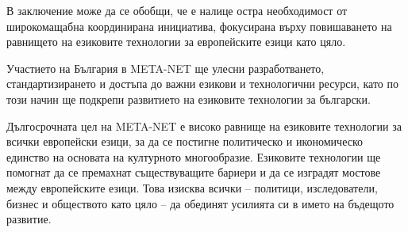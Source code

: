 \documentclass[]{../../metanetpaper}
\begin{document}
\begin{multicols}{2}
В заключение може да се обобщи, че е налице остра необходимост от
широкомащабна координирана инициатива, фокусирана върху повишаването
на равнището на езиковите технологии за европейските езици като цяло.

Участието на България в META-NET ще улесни разработването,
стандартизирането и достъпа до важни езикови и технологични ресурси,
като по този начин ще подкрепи развитието на езиковите технологии за
български.

Дългосрочната цел на META-NET е високо равнище на езиковите технологии
за всички европейски езици, за да се постигне политическо и
икономическо единство на основата на културното
многообразие. Езиковите технологии ще помогнат да се премахнат
съществуващите бариери и да се изградят мостове между европейските
езици. Това изисква всички -- политици, изследователи, бизнес и
обществото като цяло -- да обединят усилията си в името на бъдещото
развитие.
\end{multicols}

\clearpage
\end{document}

